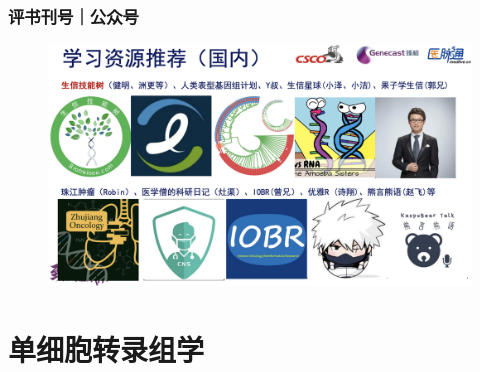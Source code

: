 \documentclass[11pt]{ctexbeamer}
\begin{document}
\begin{frame}
\frametitle{评书刊号｜公众号}
  \begin{figure}
    \centering
    \includegraphics[width=\textwidth]{wechat_01.png}
  \end{figure}
\end{frame}


\section{单细胞转录组学}
\end{document}
